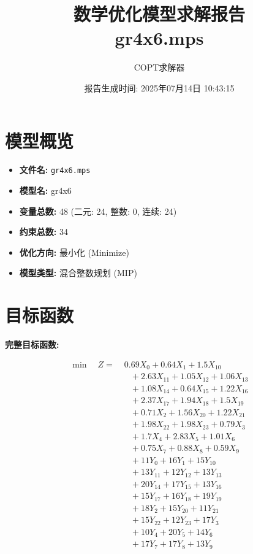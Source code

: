 \documentclass[a4paper,10pt]{article}
\title{数学优化模型求解报告\\{\large gr4x6.mps}}
\author{COPT求解器}
\date{报告生成时间: 2025年07月14日 10:43:15}
\begin{document}
\maketitle
\tableofcontents
\newpage

\section{模型概览}
\begin{itemize}
    \item \textbf{文件名:} \texttt{gr4x6.mps}
    \item \textbf{模型名:} gr4x6
    \item \textbf{变量总数:} 48 (二元: 24, 整数: 0, 连续: 24)
    \item \textbf{约束总数:} 34
    \item \textbf{优化方向:} 最小化 (Minimize)
    \item \textbf{模型类型:} 混合整数规划 (MIP)
\end{itemize}
\section{目标函数}

\textbf{完整目标函数:}

\allowdisplaybreaks
{\small
\begin{align}
\min \quad Z = &\; 0.69X_{0} + 0.64X_{1} + 1.5X_{10} \\[0.5ex]
&\quad  + 2.63X_{11} + 1.05X_{12} + 1.06X_{13} \\[0.5ex]
&\quad  + 1.08X_{14} + 0.64X_{15} + 1.22X_{16} \\[0.5ex]
&\quad  + 2.37X_{17} + 1.94X_{18} + 1.5X_{19} \\[0.5ex]
&\quad  + 0.71X_{2} + 1.56X_{20} + 1.22X_{21} \\[0.5ex]
&\quad  + 1.98X_{22} + 1.98X_{23} + 0.79X_{3} \\[0.5ex]
&\quad  + 1.7X_{4} + 2.83X_{5} + 1.01X_{6} \\[0.5ex]
&\quad  + 0.75X_{7} + 0.88X_{8} + 0.59X_{9} \\[0.5ex]
&\quad  + 11Y_{0} + 16Y_{1} + 15Y_{10} \\[0.5ex]
&\quad  + 13Y_{11} + 12Y_{12} + 13Y_{13} \\[0.5ex]
&\quad  + 20Y_{14} + 17Y_{15} + 13Y_{16} \\[0.5ex]
&\quad  + 15Y_{17} + 16Y_{18} + 19Y_{19} \\[0.5ex]
&\quad  + 18Y_{2} + 15Y_{20} + 11Y_{21} \\[0.5ex]
&\quad  + 15Y_{22} + 12Y_{23} + 17Y_{3} \\[0.5ex]
&\quad  + 10Y_{4} + 20Y_{5} + 14Y_{6} \\[0.5ex]
&\quad  + 17Y_{7} + 17Y_{8} + 13Y_{9}\nonumber
\end{align}
}
\end{document}
